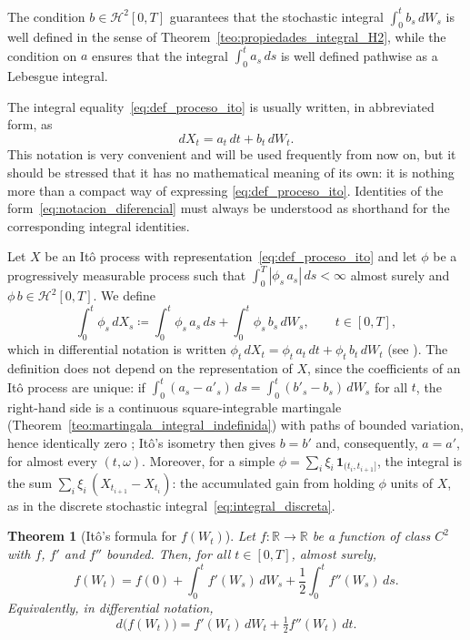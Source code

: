 \documentclass[11pt,a4paper,oneside]{report}
\theoremstyle{plain}
\newtheorem{teorema}{Theorem}[chapter]
\theoremstyle{definition}
\theoremstyle{remark}
\newcommand{\R}{\mathbb{R}}
\newcommand{\1}{\mathbf{1}}
\newcommand{\eqdef}{\coloneqq}
\begin{document}
The condition $b \in \mathcal{H}^2[0, T]$ guarantees that the
stochastic integral $\int_0^t b_s\, dW_s$ is well defined in the
sense of Theorem~\ref{teo:propiedades_integral_H2}, while the
condition on $a$ ensures that the integral $\int_0^t a_s\, ds$ is
well defined pathwise as a Lebesgue integral.

The integral
equality~\eqref{eq:def_proceso_ito} is usually written, in
abbreviated form, as
\begin{equation}\label{eq:notacion_diferencial}
  dX_t = a_t\, dt + b_t\, dW_t.
\end{equation}
This notation is very convenient and will be used frequently from now
on, but it should be stressed that it has no mathematical meaning of
its own: it is nothing more than a compact way of expressing
\eqref{eq:def_proceso_ito}. Identities of the
form~\eqref{eq:notacion_diferencial} must always be understood as
shorthand for the corresponding integral identities.

Let $X$ be an Itô process with representation~\eqref{eq:def_proceso_ito} and let $\phi$ be a progressively measurable process such that $\int_0^T |\phi_s\, a_s|\, ds < \infty$ almost surely and $\phi\, b \in \mathcal{H}^2[0, T]$. We define
\begin{equation*}
  \int_0^t \phi_s\, dX_s \eqdef \int_0^t \phi_s\, a_s\, ds + \int_0^t \phi_s\, b_s\, dW_s, \qquad t \in [0, T],
\end{equation*}
which in differential notation is written $\phi_t\, dX_t = \phi_t\, a_t\, dt + \phi_t\, b_t\, dW_t$ (see \cite[§4.2]{etheridge}). The definition does not depend on the representation of $X$, since the coefficients of an Itô process are unique: if $\int_0^t (a_s - a'_s)\, ds = \int_0^t (b'_s - b_s)\, dW_s$ for all $t$, the right-hand side is a continuous square-integrable martingale (Theorem~\ref{teo:martingala_integral_indefinida}) with paths of bounded variation, hence identically zero \cite[Lemma~4.2.11]{etheridge}; Itô's isometry then gives $b = b'$ and, consequently, $a = a'$, for almost every $(t, \omega)$. Moreover, for a simple $\phi = \sum_i \xi_i\, \mathbf{1}_{(t_i, t_{i+1}]}$, the integral is the sum $\sum_i \xi_i\, (X_{t_{i+1}} - X_{t_i})$: the accumulated gain from holding $\phi$ units of $X$, as in the discrete stochastic integral~\eqref{eq:integral_discreta}.

\begin{teorema}[Itô's formula for $f(W_t)$]
\label{teo:formula_ito_brown}
Let $f : \R \to \R$ be a function of class $C^2$ with $f$, $f'$ and
$f''$ bounded. Then, for all $t \in [0, T]$, almost surely,
\begin{equation}\label{eq:formula_ito_brown}
  f(W_t) = f(0) + \int_0^t f'(W_s)\, dW_s
        + \frac{1}{2} \int_0^t f''(W_s)\, ds.
\end{equation}
Equivalently, in differential notation,
\begin{equation*}
  d\bigl(f(W_t)\bigr) = f'(W_t)\, dW_t + \tfrac{1}{2} f''(W_t)\, dt.
\end{equation*}
\end{teorema}
\end{document}
